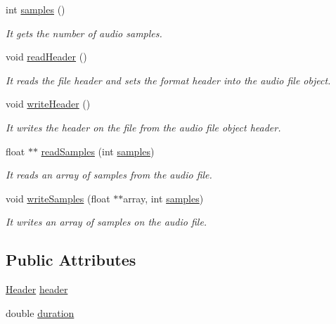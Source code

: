\begin{DoxyCompactItemize}
int \hyperlink{class_w_a_v_file_a9ca294afee7e0c17ac00cd37b56dafd6}{samples} ()
\begin{DoxyCompactList}\small\item\em It gets the number of audio samples. \end{DoxyCompactList}\item 
\mbox{\label{class_w_a_v_file_a040205c616651ffcefff3d417c72aa6c}} 
void \hyperlink{class_w_a_v_file_a040205c616651ffcefff3d417c72aa6c}{read\+Header} ()
\begin{DoxyCompactList}\small\item\em It reads the file header and sets the format header into the audio file object. \end{DoxyCompactList}\item 
\mbox{\label{class_w_a_v_file_a1ae7240dbf26d73ad9bb712bbbd4d124}} 
void \hyperlink{class_w_a_v_file_a1ae7240dbf26d73ad9bb712bbbd4d124}{write\+Header} ()
\begin{DoxyCompactList}\small\item\em It writes the header on the file from the audio file object header. \end{DoxyCompactList}\item 
float $\ast$$\ast$ \hyperlink{class_w_a_v_file_aa14a22c094f310cecc33cc573507378c}{read\+Samples} (int \hyperlink{class_w_a_v_file_a9ca294afee7e0c17ac00cd37b56dafd6}{samples})
\begin{DoxyCompactList}\small\item\em It reads an array of samples from the audio file. \end{DoxyCompactList}\item 
void \hyperlink{class_w_a_v_file_aa0f1b604b4ff5c00ee84dfd4851ad2f9}{write\+Samples} (float $\ast$$\ast$array, int \hyperlink{class_w_a_v_file_a9ca294afee7e0c17ac00cd37b56dafd6}{samples})
\begin{DoxyCompactList}\small\item\em It writes an array of samples on the audio file. \end{DoxyCompactList}\end{DoxyCompactItemize}
\subsection*{Public Attributes}
\begin{DoxyCompactItemize}
\item 
\hyperlink{struct_w_a_v_file_1_1_header}{Header} \hyperlink{class_w_a_v_file_a2060260682e854baa148ebef76d81aae}{header}
\item 
double \hyperlink{class_w_a_v_file_a4435a31465f66b639ad5f403c38ee093}{duration}
\end{DoxyCompactItemize}


